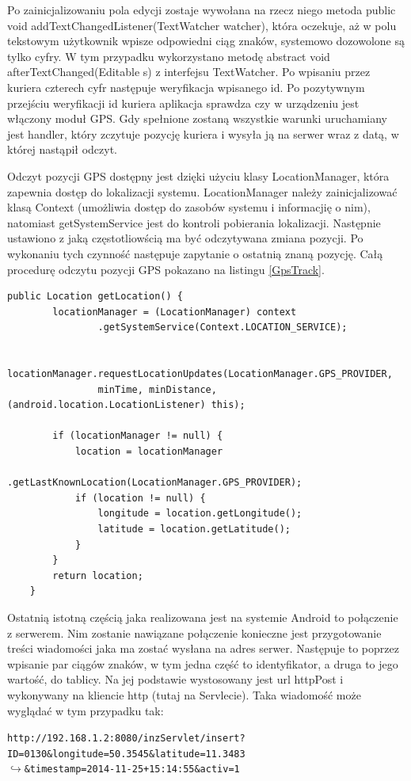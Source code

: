 \documentclass[eng,printmode,oneside]{mgr}
\begin{document}
Po zainicjalizowaniu pola edycji zostaje wywołana na rzecz niego metoda public
void addTextChangedListener(TextWatcher watcher), która oczekuje, aż w polu
tekstowym użytkownik wpisze odpowiedni ciąg znaków, systemowo dozowolone są
tylko cyfry.
W tym przypadku wykorzystano metodę abstract void afterTextChanged(Editable s) z interfejsu
TextWatcher. Po wpisaniu przez kuriera czterech cyfr następuje weryfikacja
wpisanego id. Po pozytywnym przejściu weryfikacji id kuriera aplikacja sprawdza
czy w urządzeniu jest włączony moduł GPS. Gdy spełnione zostaną wszystkie
warunki uruchamiany jest handler, który zczytuje pozycję kuriera i wysyła ją na
serwer wraz z datą, w której nastąpił odczyt. 

Odczyt pozycji GPS dostępny jest dzięki użyciu klasy LocationManager, która
zapewnia dostęp do lokalizacji systemu. LocationManager należy zainicjalizować
klasą Context (umożliwia dostęp do zasobów systemu i informacjię o nim),
natomiast getSystemService jest do kontroli pobierania lokalizacji. Następnie
ustawiono z jaką częstotliowścią ma być odczytywana zmiana pozycji. Po wykonaniu
tych czynność następuje zapytanie o ostatnią znaną pozycję. Całą
procedurę odczytu pozycji GPS pokazano na listingu \ref{GpsTrack}.

\begin{lstlisting}[caption=Pobieranie lokalizacji,label=GpsTrack]
public Location getLocation() {
		locationManager = (LocationManager) context
				.getSystemService(Context.LOCATION_SERVICE);

		locationManager.requestLocationUpdates(LocationManager.GPS_PROVIDER,
				minTime, minDistance, (android.location.LocationListener) this);

		if (locationManager != null) {
			location = locationManager
					.getLastKnownLocation(LocationManager.GPS_PROVIDER);
			if (location != null) {
				longitude = location.getLongitude();
				latitude = location.getLatitude();
			}
		}
		return location;
	}
\end{lstlisting}

Ostatnią istotną częścią jaka realizowana jest na systemie Android to połączenie
z serwerem. Nim zostanie nawiązane połączenie konieczne jest przygotowanie
treści wiadomości jaka ma zostać wysłana na adres serwer. Następuje to poprzez
wpisanie par ciągów znaków, w tym jedna część to identyfikator, a druga to jego
wartość, do tablicy. Na jej podstawie wystosowany jest url httpPost i wykonywany
na kliencie http (tutaj na Servlecie). Taka wiadomość może wyglądać w tym
przypadku tak:
\begin{flushright}
\texttt{http://192.168.1.2:8080/inzServlet/insert?ID=0130\&longitude=50.3545\&latitude=11.3483
\\$\hookrightarrow$\&timestamp=2014-11-25+15:14:55\&activ=1}
\end{flushright}
\end{document}
